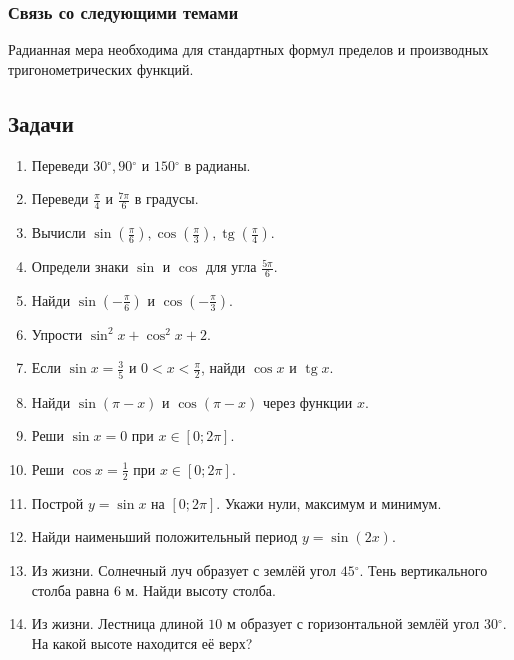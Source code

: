 \documentclass[12pt,a4paper]{article}
\theoremstyle{definition}
\theoremstyle{plain}
\theoremstyle{remark}
\begin{document}
\subsubsection*{Связь со следующими темами}
Радианная мера необходима для стандартных формул пределов и производных тригонометрических функций.
\subsection*{Задачи}
\begin{enumerate}[label=\thesection.\arabic*.,leftmargin=2.8em,itemsep=12pt]
\item Переведи \(30 {}^{\circ},\allowbreak 90 {}^{\circ}\) и \(150 {}^{\circ}\) в радианы.
\item Переведи \(\frac{\pi }{4}\) и \(\frac{7 \pi }{6}\) в градусы.
\item Вычисли \(\sin  (\frac{\pi }{6}),\allowbreak \cos  (\frac{\pi }{3}),\allowbreak \operatorname{tg}  (\frac{\pi }{4})\).
\item Определи знаки \(\sin \) и \(\cos \) для угла \(\frac{5 \pi }{6}\).
\item Найди \(\sin  (- \frac{\pi }{6})\) и \(\cos  (- \frac{\pi }{3})\).
\item Упрости \(\sin ^{2} x + \cos ^{2} x + 2\).
\item Если \(\sin  x = \frac{3}{5}\) и \(0 < x < \frac{\pi }{2}\), найди \(\cos  x\) и \(\operatorname{tg}  x\).
\item Найди \(\sin  (\pi  - x)\) и \(\cos  (\pi  - x)\) через функции \(x\).
\item Реши \(\sin  x = 0\) при \(x \in  [0;\allowbreak 2 \pi ]\).
\item Реши \(\cos  x = \frac{1}{2}\) при \(x \in  [0;\allowbreak 2 \pi ]\).
\item Построй \(y = \sin  x\) на \([0;\allowbreak 2 \pi ]\). Укажи нули, максимум и минимум.
\item Найди наименьший положительный период \(y = \sin  (2 x)\).
\item Из жизни. Солнечный луч образует с землёй угол \(45 {}^{\circ}\). Тень вертикального столба равна \(6\) м. Найди высоту столба.
\item Из жизни. Лестница длиной \(10\) м образует с горизонтальной землёй угол \(30 {}^{\circ}\). На какой высоте находится её верх?

\end{enumerate}
\end{document}
